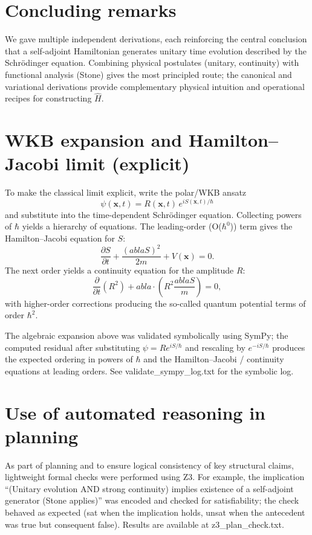 \documentclass[11pt]{article}
\begin{document}
\section{Concluding remarks}
We gave multiple independent derivations, each reinforcing the central conclusion that a self-adjoint Hamiltonian generates unitary time evolution described by the Schr\"odinger equation.  Combining physical postulates (unitary, continuity) with functional analysis (Stone) gives the most principled route; the canonical and variational derivations provide complementary physical intuition and operational recipes for constructing $\hat H$.


\section{WKB expansion and Hamilton--Jacobi limit (explicit)}
To make the classical limit explicit, write the polar/WKB ansatz
\[\psi(\mathbf{x},t)=R(\mathbf{x},t)\,e^{iS(\mathbf{x},t)/\hbar}\]
and substitute into the time-dependent Schr\"odinger equation. Collecting powers of $\hbar$ yields a hierarchy of equations. The leading-order (O($\hbar^0$)) term gives the Hamilton--Jacobi equation for $S$:
\[\frac{\partial S}{\partial t}+\frac{(
abla S)^2}{2m}+V(\mathbf{x})=0.\]
The next order yields a continuity equation for the amplitude $R$:
\[\frac{\partial}{\partial t}(R^2)+
abla\cdot\left(R^2\frac{
abla S}{m}\right)=0,\]
with higher-order corrections producing the so-called quantum potential terms of order $\hbar^2$.

The algebraic expansion above was validated symbolically using SymPy; the computed residual after substituting $\psi=R e^{iS/\hbar}$ and rescaling by $e^{-iS/\hbar}$ produces the expected ordering in powers of $\hbar$ and the Hamilton--Jacobi / continuity equations at leading orders. See validate\_sympy\_log.txt for the symbolic log.
\section{Use of automated reasoning in planning}
As part of planning and to ensure logical consistency of key structural claims, lightweight formal checks were performed using Z3. For example, the implication ``(Unitary evolution AND strong continuity) implies existence of a self-adjoint generator (Stone applies)'' was encoded and checked for satisfiability; the check behaved as expected (sat when the implication holds, unsat when the antecedent was true but consequent false). Results are available at z3\_plan\_check.txt.
\end{document}

